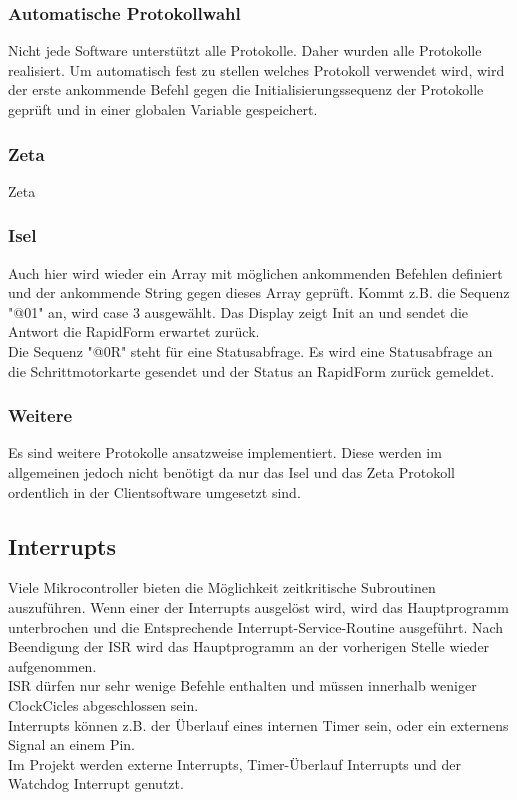 \subsubsection{Automatische Protokollwahl}
Nicht jede Software unterstützt alle Protokolle. Daher wurden alle Protokolle realisiert. Um automatisch fest zu stellen welches Protokoll verwendet wird, wird der erste ankommende Befehl gegen die Initialisierungssequenz der Protokolle geprüft und in einer globalen Variable gespeichert.
\lstset{language=C, basicstyle=\footnotesize, showstringspaces=false, tabsize=8}

\subsubsection{Zeta}
Zeta
\subsubsection{Isel}
Auch hier wird wieder ein Array mit möglichen ankommenden Befehlen definiert und der ankommende String gegen dieses Array geprüft. Kommt z.B. die Sequenz "@01" an, wird case 3 ausgewählt. Das Display zeigt Init an und sendet die Antwort die RapidForm erwartet zurück.\\
Die Sequenz "@0R" steht für eine Statusabfrage. Es wird eine Statusabfrage an die Schrittmotorkarte gesendet und der Status an RapidForm zurück gemeldet.
\lstset{language=C, basicstyle=\footnotesize, showstringspaces=false, tabsize=8}

\subsubsection{Weitere}
Es sind weitere Protokolle ansatzweise implementiert. Diese werden im allgemeinen jedoch nicht benötigt da nur das Isel und das Zeta Protokoll ordentlich in der Clientsoftware umgesetzt sind.


\subsection{Interrupts}
\label{sec:Interrupts}
Viele Mikrocontroller bieten die Möglichkeit zeitkritische Subroutinen auszuführen. Wenn einer der Interrupts ausgelöst wird, wird das Hauptprogramm unterbrochen und die Entsprechende Interrupt-Service-Routine ausgeführt. Nach Beendigung der ISR wird das Hauptprogramm an der vorherigen Stelle wieder aufgenommen.\\
ISR dürfen nur sehr wenige Befehle enthalten und müssen innerhalb weniger ClockCicles abgeschlossen sein. \\
Interrupts können z.B. der Überlauf eines internen Timer sein, oder ein externens Signal an einem Pin.\\
Im Projekt werden externe Interrupts, Timer-Überlauf Interrupts und der Watchdog Interrupt genutzt. 
